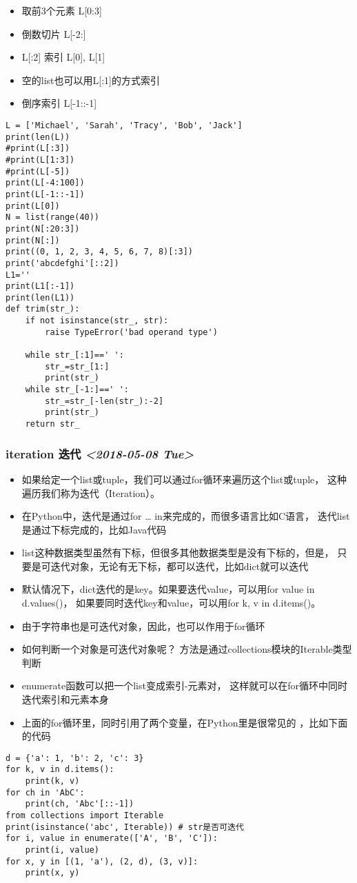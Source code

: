 \documentclass[11pt]{article}
\begin{document}
\begin{itemize}
\item 取前3个元素 L[0:3]
\item 倒数切片 L[-2:]
\item L[:2] 索引 L[0], L[1]
\item 空的list也可以用L[:1]的方式索引
\item 倒序索引 L[-1::-1]
\end{itemize}
\begin{verbatim}
L = ['Michael', 'Sarah', 'Tracy', 'Bob', 'Jack']
print(len(L))
#print(L[:3])
#print(L[1:3])
#print(L[-5])
print(L[-4:100])
print(L[-1::-1])
print(L[0])
N = list(range(40))
print(N[:20:3])
print(N[:])
print((0, 1, 2, 3, 4, 5, 6, 7, 8)[:3])
print('abcdefghi'[::2])
L1=''
print(L1[:-1])
print(len(L1))
def trim(str_):
    if not isinstance(str_, str):
        raise TypeError('bad operand type')

    while str_[:1]==' ':
        str_=str_[1:]
        print(str_)
    while str_[-1:]==' ':
        str_=str_[-len(str_):-2]
        print(str_)
    return str_
\end{verbatim}
\subsubsection{iteration 迭代 \textit{<2018-05-08 Tue>}}
\label{sec:org9273557}
\begin{itemize}
\item 如果给定一个list或tuple，我们可以通过for循环来遍历这个list或tuple，
这种遍历我们称为迭代（Iteration）。
\item 在Python中，迭代是通过for \ldots{} in来完成的，而很多语言比如C语言，
迭代list是通过下标完成的，比如Java代码
\item list这种数据类型虽然有下标，但很多其他数据类型是没有下标的，但是，
只要是可迭代对象，无论有无下标，都可以迭代，比如dict就可以迭代
\item 默认情况下，dict迭代的是key。如果要迭代value，可以用for value in d.values()，
如果要同时迭代key和value，可以用for k, v in d.items()。
\item 由于字符串也是可迭代对象，因此，也可以作用于for循环
\item 如何判断一个对象是可迭代对象呢？
方法是通过collections模块的Iterable类型判断
\item enumerate函数可以把一个list变成索引-元素对，
这样就可以在for循环中同时迭代索引和元素本身
\item 上面的for循环里，同时引用了两个变量，在Python里是很常见的
，比如下面的代码
\end{itemize}
\begin{verbatim}
d = {'a': 1, 'b': 2, 'c': 3}
for k, v in d.items():
    print(k, v)
for ch in 'AbC':
    print(ch, 'Abc'[::-1])
from collections import Iterable
print(isinstance('abc', Iterable)) # str是否可迭代
for i, value in enumerate(['A', 'B', 'C']):
    print(i, value)
for x, y in [(1, 'a'), (2, d), (3, v)]:
    print(x, y)
\end{verbatim}
\end{document}
